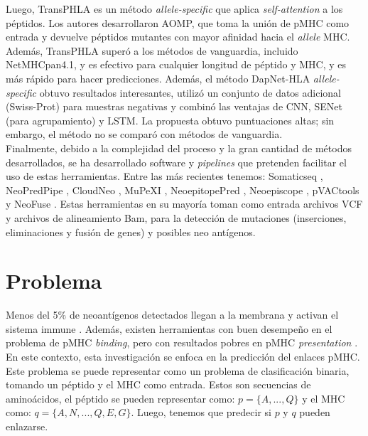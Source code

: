 \documentclass[a4paper]{article}
\begin{document}
Luego, TransPHLA \citep{chu2022transformer} es un método \textit{allele-specific} que aplica \textit{self-attention} a los péptidos. Los autores desarrollaron AOMP, que toma la unión de pMHC como entrada y devuelve péptidos mutantes con mayor afinidad hacia el \textit{allele} MHC. Además, TransPHLA superó a los métodos de vanguardia, incluido NetMHCpan4.1, y es efectivo para cualquier longitud de péptido y MHC, y es más rápido para hacer predicciones. Además, el método DapNet-HLA \textit{allele-specific} \citep{jing2023dapnet} obtuvo resultados interesantes, utilizó un conjunto de datos adicional (Swiss-Prot) para muestras negativas y combinó las ventajas de CNN, SENet (para agrupamiento) y LSTM. La propuesta obtuvo puntuaciones altas; sin embargo, el método no se comparó con métodos de vanguardia.\\


Finalmente, debido a la complejidad del proceso y la gran cantidad de métodos desarrollados, se ha desarrollado software y \textit{pipelines} que pretenden facilitar el uso de estas herramientas. Entre las más recientes tenemos: Somaticseq \citep{fang2015ensemble}, NeoPredPipe \citep{schenck2019neopredpipe}, CloudNeo \citep{bais2017cloudneo}, MuPeXI \citep{bjerregaard2017mupexi}, NeoepitopePred \citep{tran2015immunogenicity}, Neoepiscope \citep{yossef2018enhanced}, pVACtools \citep{hundal2020pvactools}  y NeoFuse \citep{gros2016prospective}. Estas herramientas en su mayoría toman como entrada archivos VCF y archivos de alineamiento Bam, para la detección de mutaciones (inserciones, eliminaciones y fusión de genes) y posibles neo antígenos. 




\section{Problema}

Menos del 5\% de neoantígenos detectados llegan a la membrana y activan el sistema immune \citep{de2020neoantigen, mill2022neoms, bulik2019deep, bassani2015mass, yadav2014predicting}. Además, existen herramientas con buen desempeño en el problema de pMHC \textit{binding}, pero con resultados pobres en  pMHC \textit{presentation} \citep{bulik2019deep}. En este contexto, esta investigación se enfoca en la predicción del enlaces pMHC. Este problema se puede representar como un problema de clasificación binaria, tomando un péptido y el MHC como entrada. Estos son secuencias de aminoácidos, el péptido se pueden representar como: $p = \{ A, ... , Q \}$ y el MHC como: $q = \{ A, N, ... ,Q, E, G \}$. Luego, tenemos que  predecir si $p$ y $q$ pueden enlazarse. %
\end{document}
